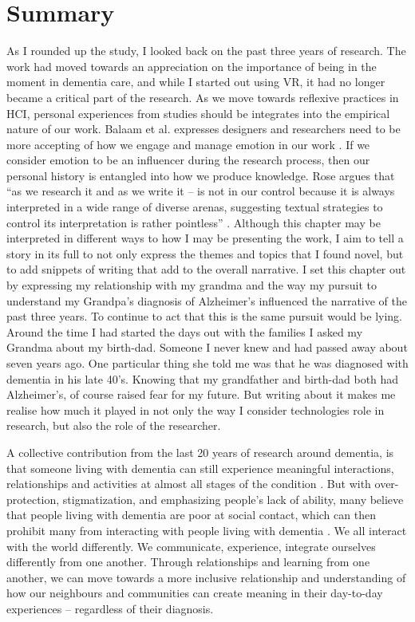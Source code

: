 \section{Summary}
\label{Relationships:Summary}
As I rounded up the study, I looked back on the past three years of research. The work had moved towards an appreciation on the importance of being in the moment in dementia care, and while I started out using VR, it had no longer became a critical part of the research. As we move towards reflexive practices in HCI, personal experiences from studies should be integrates into the empirical nature of our work. Balaam et al. expresses designers and researchers need to be more accepting of how we engage and manage emotion in our work \citep{balaam_emotion_2019}. If we consider emotion to be an influencer during the research process, then our personal history is entangled into how we produce knowledge. Rose argues that “as we research it and as we write it – is not in our control because it is always interpreted in a wide range of diverse arenas, suggesting textual strategies to control its interpretation is rather pointless” \citep{rose_situating_1997}. Although this chapter may be interpreted in different ways to how I may be presenting the work, I aim to tell a story in its full to not only express the themes and topics that I found novel, but to add snippets of writing that add to the overall narrative. I set this chapter out by expressing my relationship with my grandma and the way my pursuit to understand my Grandpa's diagnosis of Alzheimer's influenced the narrative of the past three years. To continue to act that this is the same pursuit would be lying. Around the time I had started the days out with the families I asked my Grandma about my birth-dad. Someone I never knew and had passed away about seven years ago. One particular thing she told me was that he was diagnosed with dementia in his late 40’s. Knowing that my grandfather and birth-dad both had Alzheimer's, of course raised fear for my future. But writing about it makes me realise how much it played in not only the way I consider technologies role in research, but also the role of the researcher. 

A collective contribution from the last 20 years of research around dementia, is that someone living with dementia can still experience meaningful interactions, relationships and activities at almost all stages of the condition \citep{kitwood_towards_1992}. But with over-protection, stigmatization, and emphasizing people's lack of ability, many believe that people living with dementia are poor at social contact, which can then prohibit many from interacting with people living with dementia \citep{christine_bryden_dancing_2005, riley_anxiety_2014}. We all interact with the world differently. We communicate, experience, integrate ourselves differently from one another. Through relationships and learning from one another, we can move towards a more inclusive relationship and understanding of how our neighbours and communities can create meaning in their day-to-day experiences – regardless of their diagnosis. 

